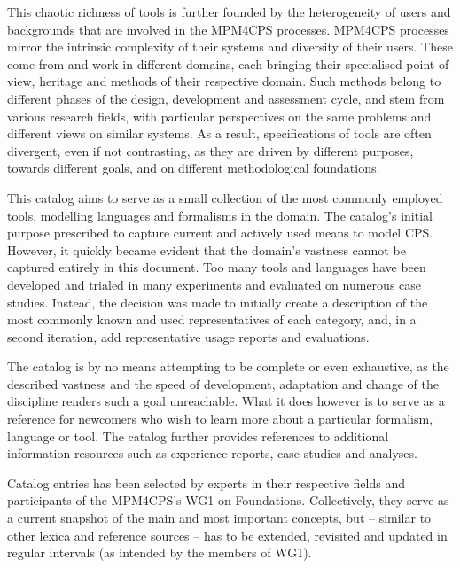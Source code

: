 \documentclass[final]{include/MPM4CPS/MPM4CPS-Report} %
\begin{document}
This chaotic richness of tools is further founded by the
heterogeneity of users and backgrounds that are involved in the MPM4CPS processes.
MPM4CPS processes mirror the intrinsic complexity of
their systems and diversity of their users. These come from and
work in different domains, each bringing their specialised point of view,
heritage and methods of their respective domain.
Such methods belong to different phases of the
design, development and assessment cycle, and stem from various research fields,
with particular perspectives on the same problems and different views on similar
systems. As a result, specifications of tools are often divergent, even if not
contrasting, as they are driven by different purposes, towards different goals,
and on different methodological foundations.

This catalog aims to serve as a small collection of the most commonly employed tools, modelling languages and formalisms in the domain.
The catalog's initial purpose prescribed to capture current and actively used means to model CPS. However, it quickly became evident that the domain's vastness cannot be captured entirely in this document. Too many tools and languages have been developed and trialed in many experiments and evaluated on numerous case studies.
Instead, the decision was made to initially create a description of the most commonly known and used representatives of each category, and, in a second iteration, add representative usage reports and evaluations.

The catalog is by no means attempting to be complete or even exhaustive, as the described vastness and the speed of development, adaptation and change of the discipline renders such a goal unreachable.
What it does however is to serve as a reference for newcomers who wish to learn more about a particular formalism, language or tool.
The catalog further provides references to additional information resources such as experience reports, case studies and analyses.

Catalog entries has been selected by experts in their respective fields and participants of the MPM4CPS's WG1 on Foundations. 
Collectively, they serve as a current snapshot of the main and most important concepts, but -- similar to other lexica and reference sources -- has to be extended, revisited and updated in regular intervals (as intended by the members of WG1).
\end{document}
